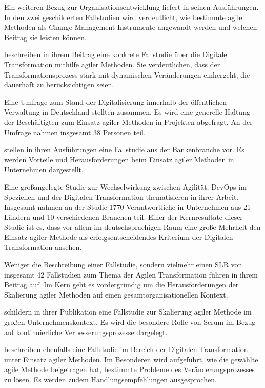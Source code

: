Ein weiteren Bezug zur Organisationsentwicklung liefert  in seinen Ausführungen. In den zwei geschilderten Fallstudien wird verdeutlicht, wie bestimmte agile Methoden als Change Management Instrumente angewandt werden und welchen Beitrag sie leisten können.

 beschreiben in ihrem Beitrag eine konkrete Fallstudie über die Digitale Transformation mithilfe agiler Methoden. Sie verdeutlichen, dass der Transformationsprozess stark mit dynamischen Veränderungen einhergeht, die dauerhaft zu berücksichtigen seien.

Eine Umfrage zum Stand der Digitalisierung innerhalb der öffentlichen Verwaltung in Deutschland stellten  zusammen. Es wird eine generelle Haltung der Beschäftigten zum Einsatz agiler Methoden in Projekten abgefragt. An der Umfrage nahmen insgesamt 38 Personen teil.

  stellen in ihren Ausführungen eine Fallstudie aus der Bankenbranche vor. Es werden Vorteile und Herausforderungen beim Einsatz agiler Methoden in Unternehmen dargestellt.

Eine großangelegte Studie zur Wechselwirkung zwischen Agilität, DevOps im Speziellen und der Digitalen Transformation thematisieren  in ihrer Arbeit. Insgesamt nahmen an der Studie 1770 Verantwortliche in Unternehmen aus 21  Ländern und 10 verschiedenen Branchen teil. Einer der Kernresultate dieser Studie ist es, dass vor allem im deutschsprachigen Raum eine große Mehrheit den Einsatz agiler Methode als erfolgsentscheidendes Kriterium der Digitalen Transformation ansehen.

Weniger die Beschreibung einer Fallstudie, sondern vielmehr einen SLR von insgesamt 42 Fallstudien zum Thema der Agilen Transformation führen  in ihrem Beitrag auf. Im Kern geht es vordergründig um die Herausforderungen der Skalierung agiler Methoden auf einen gesamtorganisationellen Kontext.

 schildern in ihrer Publikation eine Fallstudie zur Skalierung agiler Methode im großen Unternehmenskontext. Es wird die besondere Rolle von Scrum im Bezug auf kontinuierliche Verbesserungsprozesse dargelegt.

 beschreiben ebenfalls eine Fallstudie im Bereich der Digitalen Transformation unter Einsatz agiler Methoden. Im Besonderen wird aufgeführt, wie die gewählte agile Methode  beigetragen hat, bestimmte Probleme des Veränderungsprozesses zu lösen. Es werden zudem Handlungsempfehlungen ausgesprochen.


